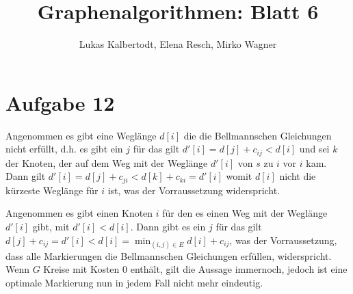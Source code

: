 \documentclass[11pt]{scrartcl} %
\title{Graphenalgorithmen: Blatt 6}
\author{Lukas Kalbertodt, Elena Resch, Mirko Wagner}
\begin{document}
\maketitle

\section*{Aufgabe 12}
\begin{compactenum}[(a)]
\item Angenommen es gibt eine Weglänge $d[i]$ die die Bellmannschen Gleichungen nicht erfüllt, d.h. es gibt ein $j$ für das gilt $d'[i]=d[j]+c_{ij}<d[i]$ und
sei $k$ der Knoten, der auf dem Weg mit der Weglänge $d'[i]$ von $s$ zu $i$ vor
$i$ kam. Dann gilt $d'[i]=d[j]+c_{ji}<d[k]+c_{ki}=d'[i]$ womit $d[i]$ nicht die
kürzeste Weglänge für $i$ ist, was der Vorraussetzung widerspricht.

\item Angenommen es gibt einen Knoten $i$ für den es einen Weg mit der Weglänge
$d'[i]$ gibt, mit $d'[i]<d[i]$. Dann gibt es ein $j$ für das gilt
$d[j]+c_{ij}=d'[i]<d[i]=\min_{(i,j)\in E}{d[i]+c_{ij}}$, was der Vorraussetzung,
dass alle Markierungen die Bellmannschen Gleichungen erfüllen, widerspricht.
\newline
Wenn $G$ Kreise mit Kosten 0 enthält, gilt die Aussage immernoch, jedoch ist
eine optimale Markierung nun in jedem Fall nicht mehr eindeutig.

\end{compactenum}
\end{document}
